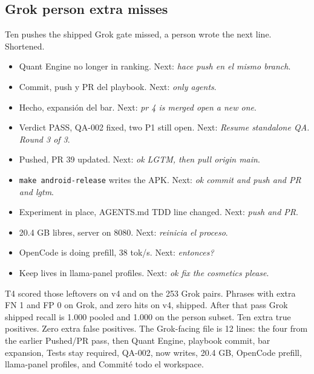 \subsection{Grok person extra misses}
\label{app:grokfn}

Ten pushes the shipped Grok gate missed, a person wrote the next
line. Shortened.

\begin{itemize}
\item Quant Engine no longer in ranking. Next: \emph{hace push en
el mismo branch}.
\item Commit, push y PR del playbook. Next: \emph{only agents}.
\item Hecho, expansi\'on del bar. Next: \emph{pr 4 is merged open
a new one}.
\item Verdict PASS, QA-002 fixed, two P1 still open. Next:
\emph{Resume standalone QA. Round 3 of 3}.
\item Pushed, PR 39 updated. Next: \emph{ok LGTM, then pull origin
main}.
\item \texttt{make android-release} writes the APK. Next: \emph{ok
commit and push and PR and lgtm}.
\item Experiment in place, AGENTS.md TDD line changed. Next:
\emph{push and PR}.
\item 20.4 GB libres, server on 8080. Next: \emph{reinicia el
proceso}.
\item OpenCode is doing prefill, 38 tok/s. Next: \emph{entonces?}
\item Keep lives in llama-panel profiles. Next: \emph{ok fix the
cosmetics please}.
\end{itemize}

T4 scored those leftovers on v4 and on the 253 Grok pairs.
Phrases with extra FN 1 and FP 0 on Grok, and zero hits on v4,
shipped. After that pass Grok shipped recall is 1.000 pooled and
1.000 on the person subset. Ten extra true positives. Zero extra
false positives. The Grok-facing file is 12 lines: the four from
the earlier Pushed/PR pass, then Quant Engine, playbook commit,
bar expansion, Tests stay required, QA-002, now writes, 20.4 GB,
OpenCode prefill, llama-panel profiles, and Commit\'e todo el
workspace.

